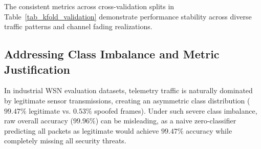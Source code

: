 \documentclass[conference]{IEEEtran}
\begin{document}
\begin{table}[htbp]
\caption{5-Fold Cross-Validation Performance Stability Breakdown}
\label{tab_kfold_validation}
\centering
\small
\renewcommand{\arraystretch}{1.15}
\end{table}

The consistent metrics across cross-validation splits in Table~\ref{tab_kfold_validation} demonstrate performance stability across diverse traffic patterns and channel fading realizations.

\subsection{Addressing Class Imbalance and Metric Justification}
In industrial WSN evaluation datasets, telemetry traffic is naturally dominated by legitimate sensor transmissions, creating an asymmetric class distribution ($99.47\%$ legitimate vs. $0.53\%$ spoofed frames). Under such severe class imbalance, raw overall accuracy ($99.96\%$) can be misleading, as a naive zero-classifier predicting all packets as legitimate would achieve $99.47\%$ accuracy while completely missing all security threats.
\end{document}
